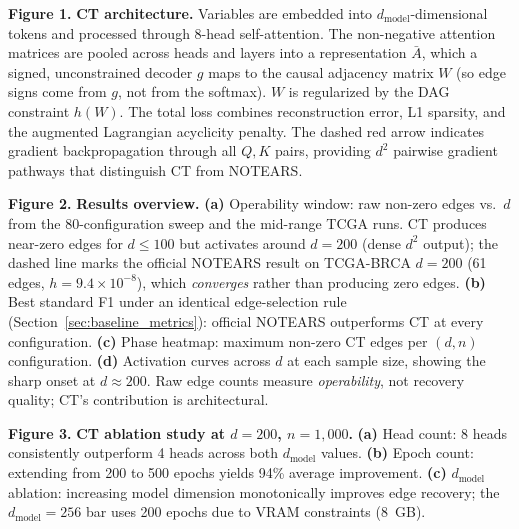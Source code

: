 \documentclass[12pt,a4paper]{article}
\begin{document}
\newpage
\noindent\textbf{Figure 1.} \textbf{CT architecture.} Variables are embedded into $d_{\text{model}}$-dimensional tokens and processed through 8-head self-attention. The non-negative attention matrices are pooled across heads and layers into a representation $\bar{A}$, which a signed, unconstrained decoder $g$ maps to the causal adjacency matrix $W$ (so edge signs come from $g$, not from the softmax). $W$ is regularized by the DAG constraint $h(W)$. The total loss combines reconstruction error, L1 sparsity, and the augmented Lagrangian acyclicity penalty. The dashed red arrow indicates gradient backpropagation through all $Q,K$ pairs, providing $d^2$ pairwise gradient pathways that distinguish CT from NOTEARS.



\noindent\textbf{Figure 2.} \textbf{Results overview.} \textbf{(a)} Operability window: raw non-zero edges vs.\ $d$ from the 80-configuration sweep and the mid-range TCGA runs. CT produces near-zero edges for $d\le100$ but activates around $d=200$ (dense $d^2$ output); the dashed line marks the official NOTEARS result on TCGA-BRCA $d=200$ (61 edges, $h=9.4\times10^{-8}$), which \emph{converges} rather than producing zero edges. \textbf{(b)} Best standard F1 under an identical edge-selection rule (Section~\ref{sec:baseline_metrics}): official NOTEARS outperforms CT at every configuration. \textbf{(c)} Phase heatmap: maximum non-zero CT edges per $(d,n)$ configuration. \textbf{(d)} Activation curves across $d$ at each sample size, showing the sharp onset at $d\approx200$. Raw edge counts measure \emph{operability}, not recovery quality; CT's contribution is architectural.



\noindent\textbf{Figure 3.} \textbf{CT ablation study at $d=200$, $n=1{,}000$.} \textbf{(a)} Head count: 8 heads consistently outperform 4 heads across both $d_{\text{model}}$ values. \textbf{(b)} Epoch count: extending from 200 to 500 epochs yields 94\% average improvement. \textbf{(c)} $d_{\text{model}}$ ablation: increasing model dimension monotonically improves edge recovery; the $d_{\text{model}}=256$ bar uses 200 epochs due to VRAM constraints (8~GB).
\end{document}
